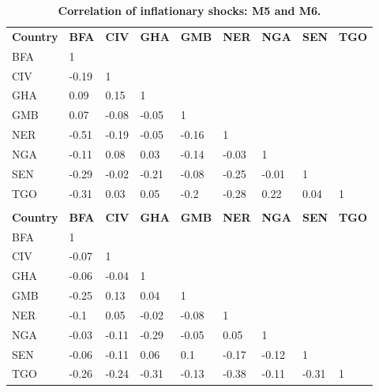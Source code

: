 \documentclass[]{article}
\begin{document}
\begingroup\fontsize{9}{11}\selectfont

\begin{longtabu} to 
\caption{\label{tab:cor-m5-m6}\bfseries{Correlation of inflationary shocks: M5 and M6.}}\\
\toprule
\addlinespace[0.3em]
\\
\hline
\textbf{Country} & \textbf{BFA} & \textbf{CIV} & \textbf{GHA} & \textbf{GMB} & \textbf{NER} & \textbf{NGA} & \textbf{SEN} & \textbf{\vphantom{1} TGO}\\
BFA & 1 &  &  &  &  &  &  \vphantom{1} & \\
CIV & -0.19 & 1 &  &  &  &  &  & \\
GHA & 0.09 & 0.15 & 1 &  &  &  &  & \\
GMB & 0.07 & -0.08 & -0.05 & 1 &  &  &  & \\
NER & -0.51 & -0.19 & -0.05 & -0.16 & 1 &  &  & \\
NGA & -0.11 & 0.08 & 0.03 & -0.14 & -0.03 & 1 &  & \\
SEN & -0.29 & -0.02 & -0.21 & -0.08 & -0.25 & -0.01 & 1 & \\
TGO & -0.31 & 0.03 & 0.05 & -0.2 & -0.28 & 0.22 & 0.04 & 1\\
\addlinespace[0.3em]
\hline
{}\\
\hline
\textbf{Country} & \textbf{BFA} & \textbf{CIV} & \textbf{GHA} & \textbf{GMB} & \textbf{NER} & \textbf{NGA} & \textbf{SEN} & \textbf{TGO}\\
BFA & 1 &  &  &  &  &  &  & \\
CIV & -0.07 & 1 &  &  &  &  &  & \\
GHA & -0.06 & -0.04 & 1 &  &  &  &  & \\
GMB & -0.25 & 0.13 & 0.04 & 1 &  &  &  & \\
NER & -0.1 & 0.05 & -0.02 & -0.08 & 1 &  &  & \\
NGA & -0.03 & -0.11 & -0.29 & -0.05 & 0.05 & 1 &  & \\
SEN & -0.06 & -0.11 & 0.06 & 0.1 & -0.17 & -0.12 & 1 & \\
TGO & -0.26 & -0.24 & -0.31 & -0.13 & -0.38 & -0.11 & -0.31 & 1\\
\bottomrule
\end{longtabu}
\endgroup{}
\end{document}

